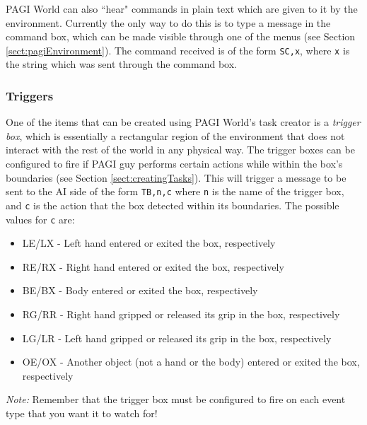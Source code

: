 PAGI World can also ``hear" commands in plain text which are given to it by the environment. Currently the only way to do this is to type a message in the command box, which can be made visible through one of the menus (see Section \ref{sect:pagiEnvironment}). The command received is of the form \texttt{SC,x}, where \texttt{x} is the string which was sent through the command box.

\subsubsection{Triggers}

One of the items that can be created using PAGI World's task creator is a \textit{trigger box}, which is essentially a rectangular region of the environment that does not interact with the rest of the world in any physical way. The trigger boxes can be configured to fire if PAGI guy performs certain actions while within the box's boundaries (see Section \ref{sect:creatingTasks}). This will trigger a message to be sent to the AI side of the form \texttt{TB,n,c} where \texttt{n} is the name of the trigger box, and \texttt{c} is the action that the box detected within its boundaries. The possible values for \texttt{c} are:

\begin{itemize}
\item{LE/LX} - Left hand entered or exited the box, respectively
\item{RE/RX} - Right hand entered or exited the box, respectively
\item{BE/BX} - Body entered or exited the box, respectively
\item{RG/RR} - Right hand gripped or released its grip in the box, respectively
\item{LG/LR} - Left hand gripped or released its grip in the box, respectively
\item{OE/OX} - Another object (not a hand or the body) entered or exited the box, respectively
\end{itemize}

\textit{Note:} Remember that the trigger box must be configured to fire on each event type that you want it to watch for!
	
